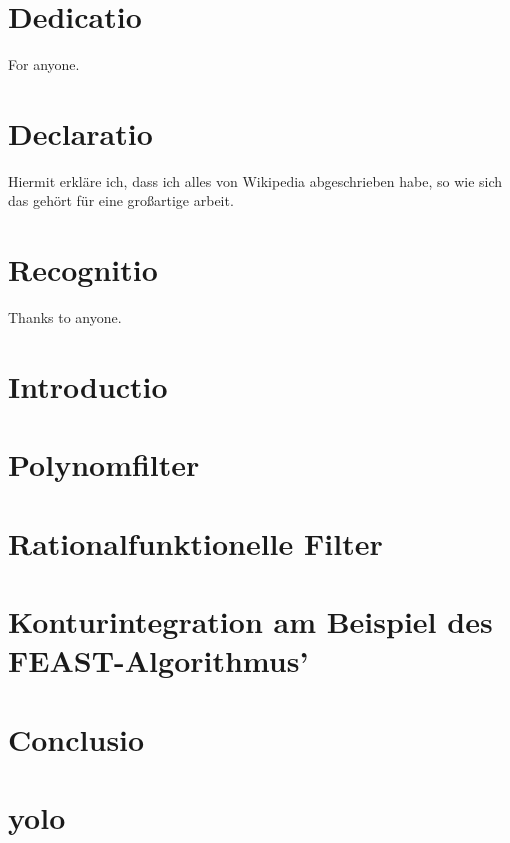 \documentclass[12pt, twoside]{report} %
\begin{document}


\chapter*{Dedicatio}
For anyone.

\chapter*{Declaratio}
Hiermit erkläre ich, dass ich alles von Wikipedia abgeschrieben habe, so
wie sich das gehört für eine großartige arbeit.

\chapter*{Recognitio}
Thanks to anyone.

\tableofcontents

\chapter{Introductio}


\chapter{Polynomfilter}


\chapter{Rationalfunktionelle Filter}


\chapter{Konturintegration am Beispiel des FEAST-Algorithmus'}


\chapter{Conclusio}


\appendix
\chapter{yolo}


\printbibliography
\end{document}

